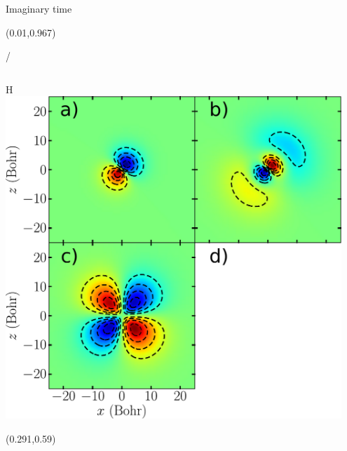 \documentclass{beamer}
\makeatletter
\newcommand{\framenumber}{
\begin{textblock}{0}(0.01,0.967)
\begin{scriptsize}
{\color{gray}\insertframenumber/\inserttotalframenumber}
\end{scriptsize}
\end{textblock}
}
\makeatother
\begin{document}
\begin{frame}{Imaginary time}\framenumber{}
   \begin{columns}[t]
        \begin{center}
        H \\
        \includegraphics[width=0.95\textwidth]{figures/h_eigenstates}

        \begin{textblock}{0.2}(0.291,0.59)
        \end{textblock}
        \end{center}


\end{columns}
\end{frame}
\end{document}
